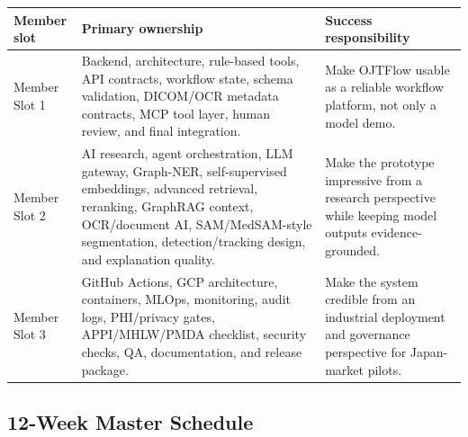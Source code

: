 \begin{longtable}{p{}p{}p{}}
\toprule
\textbf{Member slot} & \textbf{Primary ownership} & \textbf{Success responsibility} \\
\midrule
Member Slot 1 & Backend, architecture, rule-based tools, API contracts, workflow state, schema validation, DICOM/OCR metadata contracts, MCP tool layer, human review, and final integration. & Make OJTFlow usable as a reliable workflow platform, not only a model demo. \\
\addlinespace
Member Slot 2 & AI research, agent orchestration, LLM gateway, Graph-NER, self-supervised embeddings, advanced retrieval, reranking, GraphRAG context, OCR/document AI, SAM/MedSAM-style segmentation, detection/tracking design, and explanation quality. & Make the prototype impressive from a research perspective while keeping model outputs evidence-grounded. \\
\addlinespace
Member Slot 3 & GitHub Actions, GCP architecture, containers, MLOps, monitoring, audit logs, PHI/privacy gates, APPI/MHLW/PMDA checklist, security checks, QA, documentation, and release package. & Make the system credible from an industrial deployment and governance perspective for Japan-market pilots. \\
\bottomrule
\end{longtable}

\subsection{12-Week Master Schedule}

